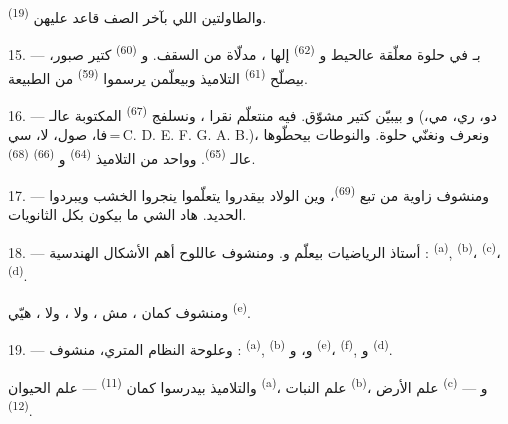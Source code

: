 والطاولتين اللي بآخر الصف قاعد عليهن 
\textsuperscript{(19)}.

\VUsaut{4.6mm}
\VUsaut{3.4mm}

15. --- بـ في  حلوة معلّقة عالحيط
و \textsuperscript{(62)} إلها ، مدلّاة من
السقف. و \textsuperscript{(60)} كتير صبور، بيصلّح
 \textsuperscript{(61)} التلاميذ وبيعلّمن يرسموا
 \textsuperscript{(59)} من الطبيعة.

16. --- و بيبيّن كتير مشوّق. فيه منتعلّم نقرا
، ونسلفج  \textsuperscript{(67)}
المكتوبة عالـ (دو، ري، مي، فا، صول، لا، سي\,=\,C. D. E.
F. G. A. B.)، ونعرف  ونغنّي  حلوة.
والنوطات بيحطّوها عالـ \textsuperscript{(65)}. وواحد من
التلاميذ  \textsuperscript{(64)}
و \textsuperscript{(66)} 
\textsuperscript{(68)}.

17. --- ومنشوف زاوية من  تبع 
\textsuperscript{(69)}، وين الولاد بيقدروا يتعلّموا ينجروا الخشب
ويبردوا الحديد. هاد الشي ما بيكون بكل الثانويات.

\VUsaut{5.0mm}
\VUsaut{3.6mm}

18. --- أستاذ الرياضيات بيعلّم   و. ومنشوف عاللوح أهم الأشكال
الهندسية :  \textsuperscript{(a)}, 
\textsuperscript{(b)}،  \textsuperscript{(c)}،
 \textsuperscript{(d)}.

ومنشوف كمان ، مش ، ولا ، ولا
، هيّي  \textsuperscript{(e)}.

19. --- وعلوحة النظام المتري، منشوف : 
\textsuperscript{(a)},  \textsuperscript{(b)}
و، و \textsuperscript{(e)}،
 \textsuperscript{(f)}, 
و \textsuperscript{(d)}.

والتلاميذ بيدرسوا كمان  \textsuperscript{(11)} —
علم الحيوان \textsuperscript{(a)}، علم النبات \textsuperscript{(b)}،
علم الأرض \textsuperscript{(c)} — و
\textsuperscript{(12)}.

